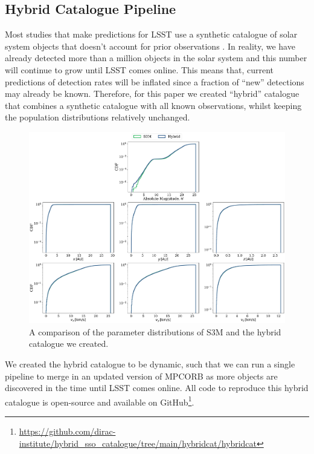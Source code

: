 \documentclass[twocolumn, twocolappendix]{aastex631}
\newcommand{\needcite}{{\color{magenta}{(needs citation)}}}
\newcommand{\sss}{S3M}
\newcommand{\mpco}{MPCORB}
\begin{document}
\subsection{Hybrid Catalogue Pipeline}\label{sec:hybrid}
Most studies that make predictions for LSST use a synthetic catalogue of solar system objects that doesn't account for prior observations \needcite{}. In reality, we have already detected more than a million objects in the solar system and this number will continue to grow until LSST comes online. This means that, current predictions of detection rates will be inflated since a fraction of ``new'' detections may already be known. Therefore, for this paper we created ``hybrid'' catalogue that combines a synthetic catalogue with all known observations, whilst keeping the population distributions relatively unchanged.

\begin{figure}[htb]
    \centering
    \includegraphics[width=\textwidth]{hybrid_vs_s3m_distributions.pdf}
    \caption{A comparison of the parameter distributions of \sss{} \citep{Grav+2011} and the hybrid catalogue we created.}
    \label{fig:hybrid_vs_s3m_dists}
\end{figure}

We created the hybrid catalogue to be dynamic, such that we can run a single pipeline to merge in an updated version of \mpco{} as more objects are discovered in the time until LSST comes online. All code to reproduce this hybrid catalogue is open-source and available on GitHub\footnote{\url{https://github.com/dirac-institute/hybrid_sso_catalogue/tree/main/hybridcat/hybridcat}}.
\end{document}
